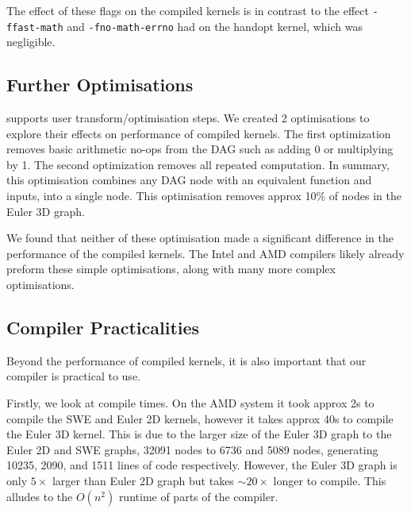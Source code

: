 The effect of these flags on the compiled kernels is in contrast to the effect \texttt{-ffast-math} and \texttt{-fno-math-errno} had on the handopt kernel, which was negligible.

\subsection{Further Optimisations}

\phlat supports user transform/optimisation steps.
We created 2 optimisations to explore their effects on performance of compiled kernels.
The first optimization removes basic arithmetic no-ops from the DAG such as adding 0 or multiplying by 1.
The second optimization removes all repeated computation.
In summary, this optimisation combines any DAG node with an equivalent function and inputs, into a single node.
This optimisation removes approx 10\% of nodes in the Euler 3D graph.

We found that neither of these optimisation made a significant difference in the performance of the compiled kernels.
The Intel and AMD compilers likely already preform these simple optimisations, along with many more complex optimisations.

\subsection{Compiler Practicalities} \label{sec:practical}
Beyond the performance of compiled kernels, it is also important that our compiler is practical to use.

Firstly, we look at compile times.
On the AMD system it took approx 2s to compile the SWE and Euler 2D kernels, however it takes approx 40s to compile the Euler 3D kernel.
This is due to the larger size of the Euler 3D graph to the Euler 2D and SWE graphs, 32091 nodes to 6736 and 5089 nodes, generating 10235, 2090, and 1511 lines of code respectively.
However, the Euler 3D graph is only $5\times$ larger than Euler 2D graph but takes $\sim 20\times$ longer to compile.
This alludes to the $O(n^2)$ runtime of parts of the compiler.

